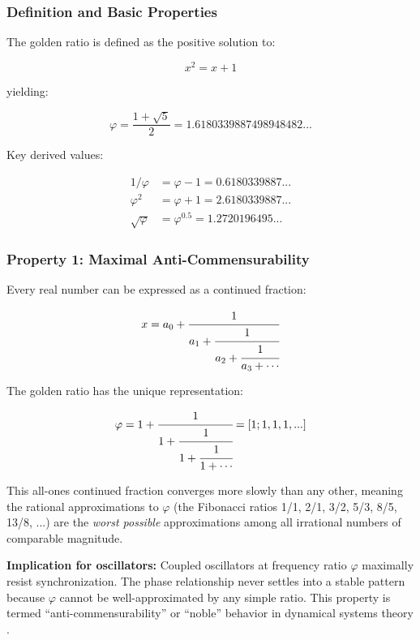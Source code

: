\documentclass[11pt,a4paper]{article}
\newcommand{\phisym}{\varphi}
\begin{document}
\subsubsection{Definition and Basic Properties}

The golden ratio is defined as the positive solution to:

\begin{equation}
x^2 = x + 1
\end{equation}

yielding:

\begin{equation}
\phisym = \frac{1 + \sqrt{5}}{2} = 1.6180339887498948482...
\end{equation}

Key derived values:

\begin{align}
1/\phisym &= \phisym - 1 = 0.6180339887... \\
\phisym^2 &= \phisym + 1 = 2.6180339887... \\
\sqrt{\phisym} &= \phisym^{0.5} = 1.2720196495...
\end{align}

\subsubsection{Property 1: Maximal Anti-Commensurability}

Every real number can be expressed as a continued fraction:

\begin{equation}
x = a_0 + \cfrac{1}{a_1 + \cfrac{1}{a_2 + \cfrac{1}{a_3 + \cdots}}}
\end{equation}

The golden ratio has the unique representation:

\begin{equation}
\phisym = 1 + \cfrac{1}{1 + \cfrac{1}{1 + \cfrac{1}{1 + \cdots}}} = [1; 1, 1, 1, ...]
\end{equation}

This all-ones continued fraction converges more slowly than any other, meaning the rational approximations to $\phisym$ (the Fibonacci ratios 1/1, 2/1, 3/2, 5/3, 8/5, 13/8, ...) are the \textit{worst possible} approximations among all irrational numbers of comparable magnitude.

\textbf{Implication for oscillators:} Coupled oscillators at frequency ratio $\phisym$ maximally resist synchronization. The phase relationship never settles into a stable pattern because $\phisym$ cannot be well-approximated by any simple ratio. This property is termed ``anti-commensurability'' or ``noble'' behavior in dynamical systems theory \citep{mackay1992}.
\end{document}
